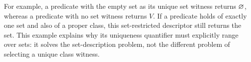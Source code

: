 For example, a predicate with the empty set as its unique set witness
returns $\varnothing$, whereas a predicate with no set witness returns $V$.
If a predicate holds of exactly one set and also of a proper class, this
set-restricted descriptor still returns the set. This example explains why
its uniqueness quantifier must explicitly range over sets: it solves the
set-description problem, not the different problem of selecting a unique
class witness.


